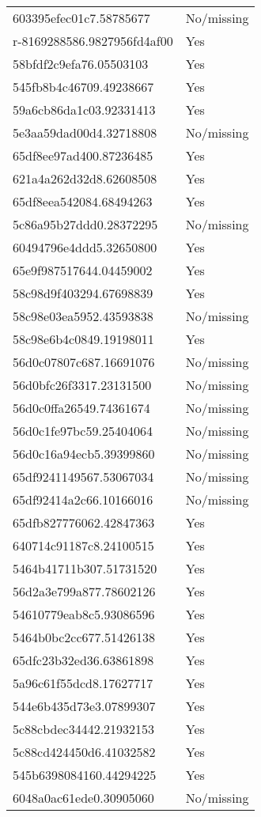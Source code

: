 \begin{tabular}{ll}
603395efec01c7.58785677 & No/missing \\
r-8169288586.9827956fd4af00 & Yes \\
58bfdf2c9efa76.05503103 & Yes \\
545fb8b4c46709.49238667 & Yes \\
59a6cb86da1c03.92331413 & Yes \\
5e3aa59dad00d4.32718808 & No/missing \\
65df8ee97ad400.87236485 & Yes \\
621a4a262d32d8.62608508 & Yes \\
65df8eea542084.68494263 & Yes \\
5c86a95b27ddd0.28372295 & No/missing \\
60494796e4ddd5.32650800 & Yes \\
65e9f987517644.04459002 & Yes \\
58c98d9f403294.67698839 & Yes \\
58c98e03ea5952.43593838 & No/missing \\
58c98e6b4c0849.19198011 & Yes \\
56d0c07807c687.16691076 & No/missing \\
56d0bfc26f3317.23131500 & No/missing \\
56d0c0ffa26549.74361674 & No/missing \\
56d0c1fe97bc59.25404064 & No/missing \\
56d0c16a94ecb5.39399860 & No/missing \\
65df9241149567.53067034 & No/missing \\
65df92414a2c66.10166016 & No/missing \\
65dfb827776062.42847363 & Yes \\
640714c91187c8.24100515 & Yes \\
5464b41711b307.51731520 & Yes \\
56d2a3e799a877.78602126 & Yes \\
54610779eab8c5.93086596 & Yes \\
5464b0bc2cc677.51426138 & Yes \\
65dfc23b32ed36.63861898 & Yes \\
5a96c61f55dcd8.17627717 & Yes \\
544e6b435d73e3.07899307 & Yes \\
5c88cbdec34442.21932153 & Yes \\
5c88cd424450d6.41032582 & Yes \\
545b6398084160.44294225 & Yes \\
6048a0ac61ede0.30905060 & No/missing \\

\end{tabular}
